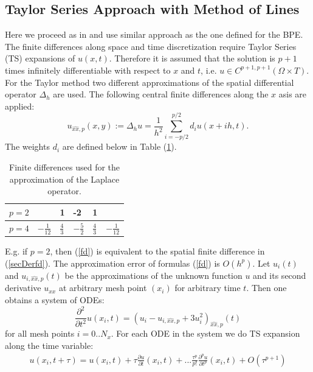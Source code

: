 \documentclass[%
 aip,
cp,  
 amsmath,amssymb,
 reprint,
]{iopconfser}
\newcommand{\be}{\begin{equation}}
\newcommand{\ee}{\end{equation}}
\newcommand{\rf}[1]{(\ref{#1})}
\begin{document}
\subsection{ Taylor Series Approach with Method of Lines}
Here we proceed as in \cite{refHyp} and use similar approach as the one defined for the BPE.
The finite differences along space and time discretization require Taylor Series (TS) expansions of $u(x,t)$. Therefore it is assumed that the solution is $p+1$ times infinitely differentiable with respect to $x$ and $t$, i.e. $u \in C^{p+1,p+1}(\Omega \times T)$.
For the Taylor method two different approximations of the spatial differential operator $\Delta_h$ are used. The following central finite differences along the $x$ asis are applied:
\begin{equation}\label{fd}
u_{\widehat{xx},p}(x,y) :=  \Delta_h u  = \frac{1}{h^2} \sum\limits_{i=-p/2}^{p/2} d_i u(x+ih, t).
\end{equation}
The weights $d_i$ are defined below in Table \rf{table:A00}.
\begin{table}[ht]
\centering
\small
		\begin{tabular}{|c|l|l|l|l|l|}

			\hline
            $p=2$          &                                           &     1      &   -2   &    1       &     \\
   			\hline 
           $p=4$          &                              $-\frac{1}{12}$     &     $\frac{4}{3}$      &   $-\frac{5}{2} $     &    $\frac{4}{3}$    &  $-\frac{1}{12}$      \\ 
	   \hline
		\end{tabular}
	\caption{ Finite differences used for the approximation of the Laplace operator.}
	\label{table:A00}
\end{table}
E.g. if $p=2$, then \rf{fd} is equivalent to the spatial finite difference in \rf{secDerfd}.  The approximation error of formulas \rf{fd} is $O(h^p)$. Let $u_{i}(t)$ and $u_{i, \widehat{xx}, p}(t)$ be the approximations of the unknown function $u$ and its second derivative $u_{xx}$ at arbitrary mesh point $(x_i)$ for arbitrary time $t$. Then one obtains a system of ODEs:
\be \label{DiscreteEq}
\frac{\partial^2 }{\partial t^2}u(x_i, t) =
(u_{i} - u_{i, \widehat{xx}, p} + 3u^2_{i})_{\widehat{xx}, p}(t) 
\ee
for all mesh points $i = 0..N_x$. For each ODE in the system we do TS expansion along the time variable:
\begin{align} \label{TSe}
u(x_i, t+\tau) = u(x_i, t) + \tau \frac{ \partial u }{ \partial t }(x_i,t)  + ... 
\frac{ \tau^p }{ p! } \frac{ \partial^p u }{ \partial t^p }(x_i, t) + O(\tau^{p+1})
\end{align}
\end{document}
